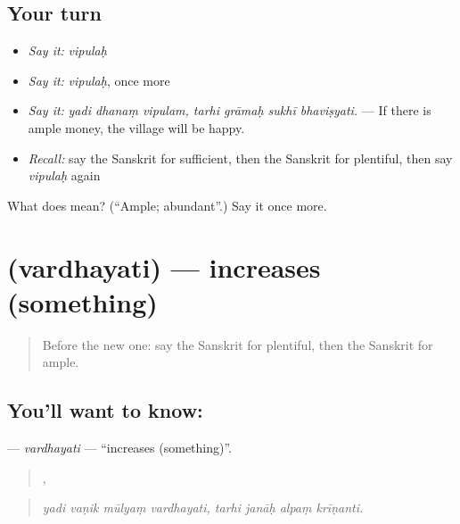\subsection*{Your turn}
\begin{itemize}
\raggedright
  \item \emph{Say it:} \emph{vipulaḥ}
  \item \emph{Say it:} \emph{vipulaḥ}, once more
  \item \emph{Say it:} \emph{yadi dhanaṃ vipulam, tarhi grāmaḥ sukhī bhaviṣyati.} — If there is ample money, the village will be happy.
  \item \emph{Recall:} say the Sanskrit for sufficient, then the Sanskrit for plentiful, then say \emph{vipulaḥ} again
\end{itemize}

\begin{tcolorbox}[breakable,colback=teal!4,colframe=teal!35!black,title={Before you move on}]
What does  mean? (\textquotedblleft{}Ample; abundant\textquotedblright{}.) Say it once more.
\end{tcolorbox}
\section[\texorpdfstring{\sk{वर्धयति} (vardhayati)}{वर्धयति (vardhayati)}]{ (vardhayati) — increases (something)}

\label{lesson:SA-C379-vardhayati}



\begin{quote}
Before the new one: say the Sanskrit for plentiful, then the Sanskrit for ample.
\end{quote}

\subsection*{You'll want to know: }
\textbf{} — \emph{vardhayati} — \textquotedblleft{}increases (something)\textquotedblright{}.

\begin{quote}
   ,    
\end{quote}

\begin{quote}
\emph{yadi vaṇik mūlyaṃ vardhayati, tarhi janāḥ alpaṃ krīṇanti.}
\end{quote}

